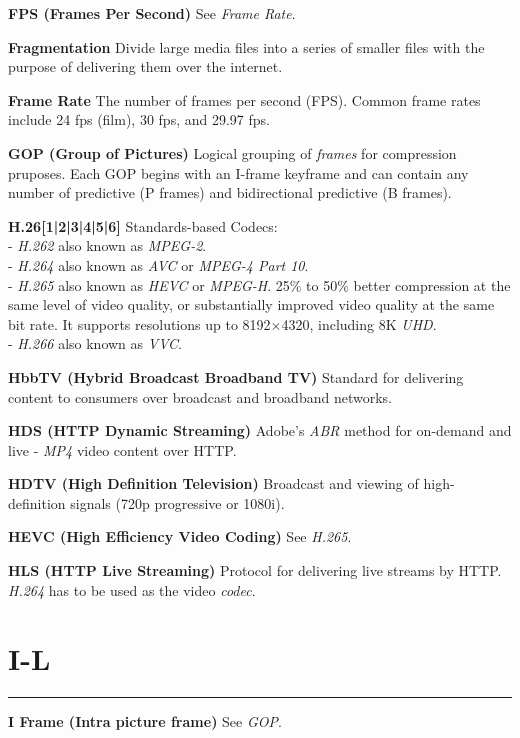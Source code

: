 \smallskip
\textbf{FPS (Frames Per Second)}
See \textit{Frame Rate}.

\smallskip
\textbf{Fragmentation}
Divide large media files into a series of smaller files with the purpose of delivering them over the internet.

\smallskip
\textbf{Frame Rate}
The number of frames per second (FPS). Common frame rates include 24 fps (film), 30 fps, and 29.97 fps.

\smallskip
\textbf{GOP (Group of Pictures)}
Logical grouping of \textit{frames} for compression pruposes. Each GOP begins with an I-frame keyframe and can contain any number of predictive (P frames) and bidirectional predictive (B frames).

\smallskip
\textbf{H.26[1|2|3|4|5|6]}
Standards-based Codecs:\\
 - \textit{H.262} also known as \textit{MPEG-2}.\\
 - \textit{H.264} also known as \textit{AVC} or  \textit{MPEG-4 Part 10}.\\
 - \textit{H.265} also known as \textit{HEVC} or \textit{MPEG-H}. 25\% to 50\% better compression at the same level of video quality, or substantially improved video quality at the same bit rate. It supports resolutions up to 8192×4320, including 8K \textit{UHD}.\\
 - \textit{H.266} also known as \textit{VVC}.

\smallskip
\textbf{HbbTV (Hybrid Broadcast Broadband TV)}
Standard for delivering content to consumers over broadcast and broadband networks.

\smallskip
\textbf{HDS (HTTP Dynamic Streaming)}
Adobe's \textit{ABR} method for on-demand and live - \textit{MP4} video content over HTTP.

\smallskip
\textbf{HDTV (High Definition Television)}
Broadcast and viewing of high-definition signals (720p progressive or 1080i).

\smallskip
\textbf{HEVC (High Efficiency Video Coding)}
See \textit{H.265}.

\smallskip
\textbf{HLS (HTTP Live Streaming)}
Protocol for delivering live streams by HTTP.  \textit{H.264} has to be used as the video \textit{codec}.


\section{I-L}
\hrule

\medskip
\textbf{I Frame (Intra picture frame)}
See \textit{GOP}.

